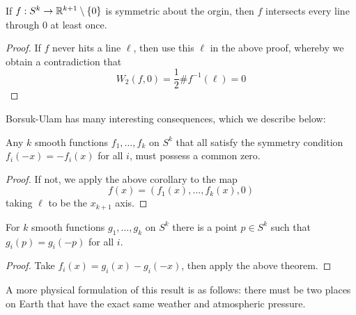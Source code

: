 \begin{theorem}
    If $f: S^k \to \mathbb{R}^{k+1} \setminus \{0\}$ is symmetric about the orgin, then $f$ intersects every line through 0 at least once. 
\end{theorem}

\begin{proof}
    If $f$ never hits a line $\ell$, then use this $\ell$ in the above proof, whereby we obtain a contradiction that
    \[W_2(f,0) = \frac{1}{2}\#f^{-1}(\ell) = 0\]
\end{proof}

Borsuk-Ulam has many interesting consequences, which we describe below:

\begin{corollary}
    Any $k$ smooth functions $f_1,\ldots, f_k$ on $S^k$ that all satisfy the symmetry condition $f_i(-x) = -f_i(x)$ for all $i$, must possess a common zero.
\end{corollary}

\begin{proof}
    If not, we apply the above corollary to the map 
    \[f(x) = (f_1(x),\ldots,f_k(x),0)\]
    taking $\ell$ to be the $x_{k+1}$ axis. 
\end{proof}

\begin{theorem}
    For $k$ smooth functions $g_1,\ldots, g_k$ on $S^k$ there is a point $p \in S^k$ such that $g_i(p) = g_i(-p)$ for all $i$.
\end{theorem}

\begin{proof}
    Take $f_i(x) = g_i(x) - g_i(-x)$, then apply the above theorem. 
\end{proof}

A more physical formulation of this result is as follows: there must be two places on Earth that have the exact same weather and atmospheric pressure. 